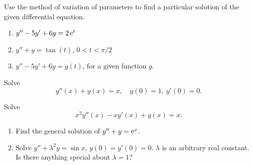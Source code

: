 {%
\begin{Exercise}
  \label{exercise y5y6y2et}
  Use the method of variation of parameters to find a
  particular solution of the given differential equation. 
  \begin{enumerate}
  \item $y'' - 5 y' + 6 y = 2 \mathop{\mathrm{e}}\nolimits^t$
  \item $y'' + y = \tan(t)$, $0<t<\pi/2$
  \item $y'' - 5 y' + 6 y = g(t)$, for a given function $g$.
  \end{enumerate}

\end{Exercise}






\begin{Exercise}
  \label{exercise y+y=x}
  Solve
  \[
  y''(x) + y(x) = x, \quad y(0) = 1,\ y'(0) = 0.
  \]

\end{Exercise}





\begin{Exercise}
  \label{exercise x2y-xy+y=x}
  Solve
  \[
  x^2 y''(x) - x y'(x) + y(x) = x.
  \]

\end{Exercise}




\begin{Exercise}
  \label{exercise y+y=ex}
  \begin{enumerate}
  \item
    Find the general solution of $y'' + y = \mathop{\mathrm{e}}\nolimits^x$.
  \item
    Solve $y'' + \lambda^2 y = \sin x$, $y(0) = y'(0) = 0$.  $\lambda$ is an 
    arbitrary real constant.  Is there anything special about $\lambda = 1$?
  \end{enumerate}

\end{Exercise}




}
